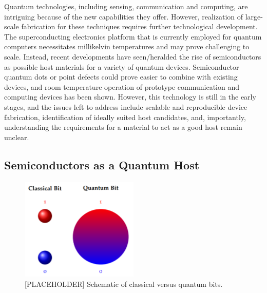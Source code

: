 \documentclass[superscriptaddress,unsortedaddress,
 amsmath,amssymb,
 aps,
]{revtex4-2}
\begin{document}

Quantum technologies, including sensing, communication and computing, 
are intriguing because of the new capabilities they offer. 
However, realization of large-scale fabrication for these techniques requires further technological development. 
The superconducting electronics platform that is currently employed for quantum computers necessitates millikelvin temperatures and may prove challenging to scale. 
Instead, recent developments have seen/heralded the rise of semiconductors as possible host materials for a variety of quantum devices. Semiconductor quantum dots or point defects could prove easier to combine with existing devices, and room temperature operation of prototype communication and computing devices has been shown.  
However, this technology is still in the early stages, and the issues left to address include scalable and reproducible device fabrication, identification of ideally suited host candidates, and, importantly, understanding the requirements for a material to act as a good host remain unclear. 

\subsection*{Semiconductors as a Quantum Host} %

\begin{figure}[t]
    \centering
    \includegraphics[width=0.5\textwidth]{figures/qubit.png}
    \caption{[PLACEHOLDER] Schematic of classical versus quantum bits. }
    \label{fig:qt}
\end{figure}
\end{document}
